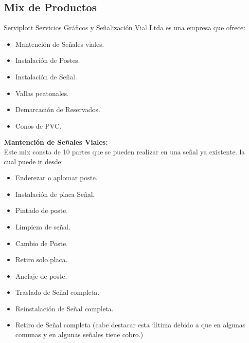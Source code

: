 	\subsection{Mix de Productos}
	Serviplott Servicios Gráficos y Señalización Vial Ltda es una empresa que ofrece:
	\begin{itemize}
	\item Mantención de Señales viales.
	\item Instalación de Postes.
	\item Instalación de Señal.
	\item Vallas peatonales. 
	\item Demarcación de Reservados. 
	\item Conos de PVC.
	\end{itemize}
	\textbf{Mantención de Señales Viales:} \\
\vspace{3mm} Este mix consta de 10 partes que se pueden realizar en una señal ya existente. la cual puede ir desde:
	\begin{itemize}
	\item Enderezar o aplomar poste. 
	\item Instalación de placa Señal. 
	\item Pintado de poste.
	\item Limpieza de señal.
	\item Cambio de Poste.
	\item Retiro solo placa.
	\item Anclaje de poste.
	\item Traslado de Señal completa.
	\item Reinstalación de Señal completa.
	\item Retiro de Señal completa (cabe destacar esta última debido a que en algunas 		comunas y en algunas señales tiene cobro.) 
	\end{itemize}
	
